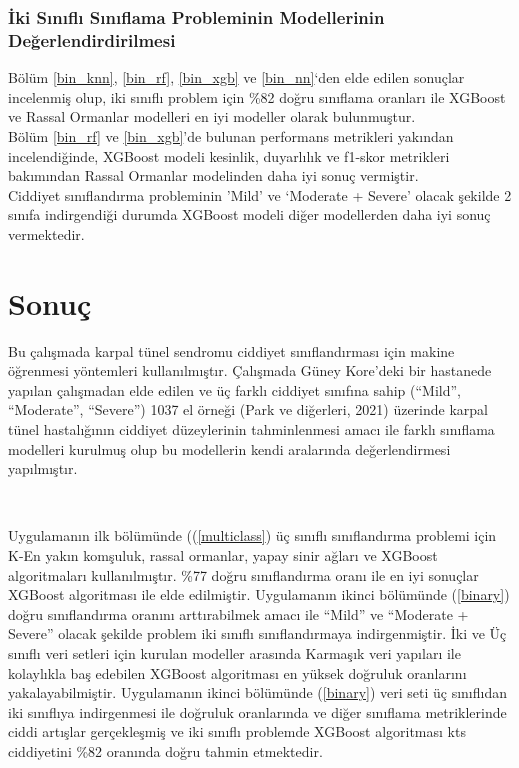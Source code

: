 \documentclass[12pt,twoside]{deuthesis}
\begin{document}
\hypertarget{iki-sux131nux131flux131-sux131nux131flama-probleminin-modellerinin-deux11ferlendirdirilmesi}{%
\subsection{İki Sınıflı Sınıflama Probleminin Modellerinin Değerlendirdirilmesi}\label{iki-sux131nux131flux131-sux131nux131flama-probleminin-modellerinin-deux11ferlendirdirilmesi}}

Bölüm \ref{bin_knn}, \ref{bin_rf}, \ref{bin_xgb} ve \ref{bin_nn}`den elde edilen sonuçlar incelenmiş olup, iki sınıflı problem için \%82 doğru sınıflama oranları ile XGBoost ve Rassal Ormanlar modelleri en iyi modeller olarak bulunmuştur.\\
Bölüm \ref{bin_rf} ve \ref{bin_xgb}'de bulunan performans metrikleri yakından incelendiğinde, XGBoost modeli kesinlik, duyarlılık ve f1-skor metrikleri bakımından Rassal Ormanlar modelinden daha iyi sonuç vermiştir.\\
Ciddiyet sınıflandırma probleminin 'Mild' ve `Moderate + Severe' olacak şekilde 2 sınıfa indirgendiği durumda XGBoost modeli diğer modellerden daha iyi sonuç vermektedir.

\hypertarget{sonuuxe7}{%
\chapter*{Sonuç}\label{sonuuxe7}}

Bu çalışmada karpal tünel sendromu ciddiyet sınıflandırması için makine öğrenmesi yöntemleri kullanılmıştır. Çalışmada Güney Kore'deki bir hastanede yapılan çalışmadan elde edilen ve üç farklı ciddiyet sınıfına sahip (``Mild'', ``Moderate'', ``Severe'') 1037 el örneği (Park ve diğerleri, 2021) üzerinde karpal tünel hastalığının ciddiyet düzeylerinin tahminlenmesi amacı ile farklı sınıflama modelleri kurulmuş olup bu modellerin kendi aralarında değerlendirmesi yapılmıştır.

~

Uygulamanın ilk bölümünde ((\ref{multiclass}) üç sınıflı sınıflandırma problemi için K-En yakın komşuluk, rassal ormanlar, yapay sinir ağları ve XGBoost algoritmaları kullanılmıştır. \%77 doğru sınıflandırma oranı ile en iyi sonuçlar XGBoost algoritması ile elde edilmiştir. Uygulamanın ikinci bölümünde (\ref{binary}) doğru sınıflandırma oranını arttırabilmek amacı ile ``Mild'' ve ``Moderate + Severe'' olacak şekilde problem iki sınıflı sınıflandırmaya indirgenmiştir. İki ve Üç sınıflı veri setleri için kurulan modeller arasında Karmaşık veri yapıları ile kolaylıkla baş edebilen XGBoost algoritması en yüksek doğruluk oranlarını yakalayabilmiştir. Uygulamanın ikinci bölümünde (\ref{binary}) veri seti üç sınıflıdan iki sınıflıya indirgenmesi ile doğruluk oranlarında ve diğer sınıflama metriklerinde ciddi artışlar gerçekleşmiş ve iki sınıflı problemde XGBoost algoritması kts ciddiyetini \%82 oranında doğru tahmin etmektedir.
\end{document}
